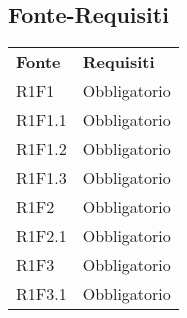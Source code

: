 \subsection{Fonte-Requisiti}
\begin{center}
	
	\begin{longtable}{ >{\centering}p{}
			>{\centering}p{}}
		
		\rowcolorhead 
		\textbf{\color{white}Fonte}
		& \textbf{\color{white}Requisiti} 
		\tabularnewline 	
		
		R1F1 & Obbligatorio 
		\tabularnewline
		R1F1.1 & Obbligatorio 
		\tabularnewline
		R1F1.2 & Obbligatorio 
		\tabularnewline
		R1F1.3 & Obbligatorio 
		\tabularnewline
		
		R1F2 & Obbligatorio 
		\tabularnewline
		R1F2.1 & Obbligatorio 
		\tabularnewline
		R1F3 & Obbligatorio 
		\tabularnewline 
		R1F3.1 & Obbligatorio 
		\tabularnewline
		
		
		
		
	\end{longtable}
\end{center}

